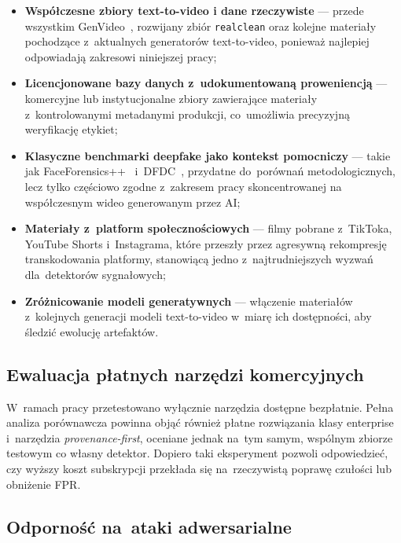 \begin{itemize}
  \item \textbf{Współczesne zbiory text-to-video i dane rzeczywiste} --- przede wszystkim
        GenVideo~\cite{Sun2024GenVideo}, rozwijany zbiór \texttt{realclean} oraz kolejne
        materiały pochodzące z~aktualnych generatorów text-to-video, ponieważ najlepiej
        odpowiadają zakresowi niniejszej pracy;
  \item \textbf{Licencjonowane bazy danych z~udokumentowaną proweniencją} ---
        komercyjne lub instytucjonalne zbiory zawieraj\k{a}ce materia\l{}y
        z~kontrolowanymi metadanymi produkcji, co~umo\.{z}liwia precyzyjn\k{a}
        weryfikacj\k{e} etykiet;
  \item \textbf{Klasyczne benchmarki deepfake jako kontekst pomocniczy} --- takie jak
        FaceForensics++~\cite{Rossler2019FaceForensics} i~DFDC~\cite{Dolhansky2020DFDC},
        przydatne do~porównań metodologicznych, lecz tylko częściowo zgodne z~zakresem
        pracy skoncentrowanej na współczesnym wideo generowanym przez AI;
  \item \textbf{Materia\l{}y z~platform spo\l{}eczno\'{s}ciowych} --- filmy pobrane z~TikToka,
        YouTube Shorts i~Instagrama, kt\'{o}re przesz\l{}y przez agresywn\k{a} rekompresj\k{e}
        transkodowania platformy, stanowi\k{a}c\k{a} jedno z~najtrudniejszych wyzwa\'{n}
        dla~detektor\'{o}w sygna\l{}owych;
  \item \textbf{Zr\'{o}\.{z}nicowanie modeli generatywnych} --- w\l{}\k{a}czenie materia\l{}\'{o}w
        z~kolejnych generacji modeli text-to-video w~miar\k{e} ich dost\k{e}pno\'{s}ci,
        aby \'{s}ledzi\'{c} ewolucj\k{e} artefakt\'{o}w.
\end{itemize}

\subsection{Ewaluacja p\l{}atnych narz\k{e}dzi komercyjnych}

W~ramach pracy przetestowano wy\l{}\k{a}cznie narz\k{e}dzia dost\k{e}pne bezp\l{}atnie.
Pe\l{}na analiza por\'{o}wnawcza powinna obj\k{a}\'{c} również p\l{}atne rozwiązania
klasy enterprise i~narzędzia \textit{provenance-first}, oceniane jednak
na~tym samym, wspólnym zbiorze testowym co własny detektor. Dopiero taki eksperyment
pozwoli odpowiedzieć, czy wyższy koszt subskrypcji przekłada się na~rzeczywistą
poprawę czułości lub obniżenie FPR.

\subsection{Odporno\'{s}\'{c} na~ataki adwersarialne}

